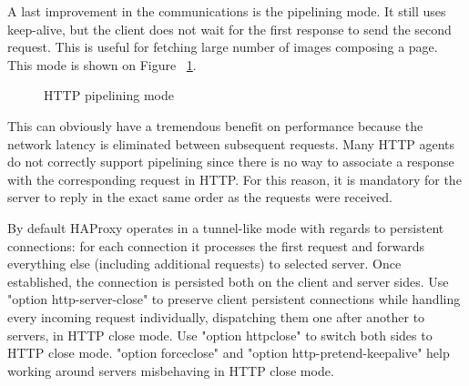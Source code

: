 A last improvement in the communications is the pipelining mode. It still uses
keep-alive, but the client does not wait for the first response to send the
second request. This is useful for fetching large number of images composing a
page. This mode is shown on Figure ~\ref{fig:http_pipelining}.

\begin{figure}[p]
  \centering
  \caption{HTTP pipelining mode}
  \label{fig:http_pipelining}
\end{figure}

This can obviously have a tremendous benefit on performance because the network
latency is eliminated between subsequent requests. Many HTTP agents do not
correctly support pipelining since there is no way to associate a response with
the corresponding request in HTTP. For this reason, it is mandatory for the
server to reply in the exact same order as the requests were received.

By default HAProxy operates in a tunnel-like mode with regards to persistent
connections: for each connection it processes the first request and forwards
everything else (including additional requests) to selected server. Once
established, the connection is persisted both on the client and server
sides. Use "option http-server-close" to preserve client persistent connections
while handling every incoming request individually, dispatching them one after
another to servers, in HTTP close mode. Use "option httpclose" to switch both
sides to HTTP close mode. "option forceclose" and "option
http-pretend-keepalive" help working around servers misbehaving in HTTP close
mode.


